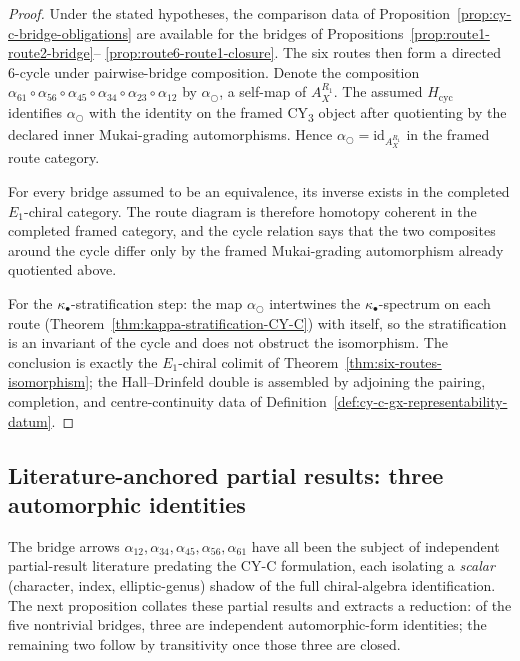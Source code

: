 \begin{proof}
Under the stated hypotheses, the comparison data of
Proposition~\ref{prop:cy-c-bridge-obligations} are available for the
bridges of Propositions~\ref{prop:route1-route2-bridge}--
\ref{prop:route6-route1-closure}. The six routes then form a directed
$6$-cycle under pairwise-bridge composition. Denote the composition
$\alpha_{61} \circ \alpha_{56} \circ \alpha_{45} \circ \alpha_{34}
\circ \alpha_{23} \circ \alpha_{12}$ by $\alpha_\bigcirc$, a self-map of
$A_X^{R_1}$. The assumed \(H_{\mathrm{cyc}}\) identifies
\(\alpha_\bigcirc\) with the identity on the framed
CY\textsubscript{3} object after quotienting by the declared inner
Mukai-grading automorphisms. Hence
$\alpha_\bigcirc = \mathrm{id}_{A_X^{R_1}}$ in the framed route category.

For every bridge assumed to be an equivalence, its inverse exists in the
completed $E_1$-chiral category. The route diagram is therefore homotopy
coherent in the completed framed category, and the cycle relation says
that the two composites around the cycle differ only by the framed
Mukai-grading automorphism already quotiented above.

For the $\kappa_\bullet$-stratification step: the map $\alpha_\bigcirc$ intertwines the $\kappa_\bullet$-spectrum on each route (Theorem~\ref{thm:kappa-stratification-CY-C}) with itself, so the stratification is an invariant of the cycle and does not obstruct the isomorphism. The conclusion is exactly the $E_1$-chiral colimit of Theorem~\ref{thm:six-routes-isomorphism}; the Hall--Drinfeld double is assembled by adjoining the pairing, completion, and centre-continuity data of Definition~\ref{def:cy-c-gx-representability-datum}.
\end{proof}

\subsection{Literature-anchored partial results: three automorphic identities}
\label{subsec:cy-c-pairwise-agreements}

The bridge arrows $\alpha_{12}, \alpha_{34}, \alpha_{45}, \alpha_{56}, \alpha_{61}$ have all been the subject of independent partial-result literature predating the CY-C formulation, each isolating a \emph{scalar} (character, index, elliptic-genus) shadow of the full chiral-algebra identification. The next proposition collates these partial results and extracts a reduction: of the five nontrivial bridges, three are independent automorphic-form identities; the remaining two follow by transitivity once those three are closed.

